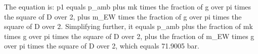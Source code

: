 The equation is:
p1 equals p_amb plus mk times the fraction of g over pi times the square of D over 2, plus m_EW times the fraction of g over pi times the square of D over 2. Simplifying further, it equals p_amb plus the fraction of mk times g over pi times the square of D over 2, plus the fraction of m_EW times g over pi times the square of D over 2, which equals 71.9005 bar.
